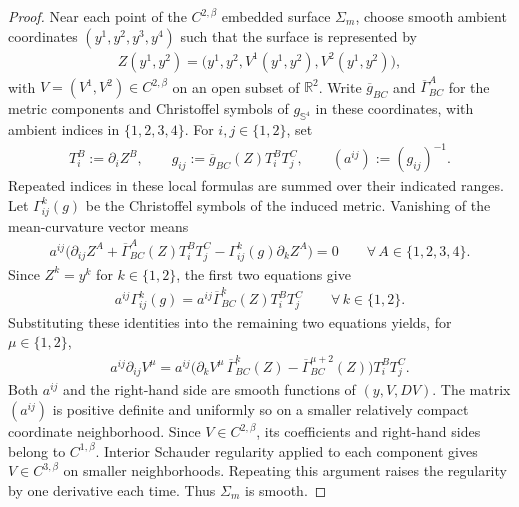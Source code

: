 \documentclass[a4paper,11pt,oneside,reqno]{amsart}
\numberwithin{equation}{section}
\theoremstyle{definition}
\begin{document}
\begin{proof}
    Near each point of the $C^{2,\beta}$ embedded surface
    $\Sigma_m$, choose smooth ambient coordinates
    $(y^1,y^2,y^3,y^4)$ such that the surface is represented by
    \begin{align*}
        Z(y^1,y^2)
        =\bigl(y^1,y^2,V^1(y^1,y^2),V^2(y^1,y^2)\bigr),
    \end{align*}
    with $V=(V^1,V^2)\in C^{2,\beta}$ on an open subset of
    $\mathbb R^2$. Write $\overline g_{BC}$ and
    $\overline\Gamma^A_{BC}$ for the metric components and
    Christoffel symbols of $g_{\mathbb S^4}$ in these coordinates,
    with ambient indices in $\{1,2,3,4\}$.
    For $i,j\in\{1,2\}$, set
    \begin{align*}
        T_i^B:=\partial_i Z^B,
        \qquad
        g_{ij}:=\overline g_{BC}(Z)T_i^BT_j^C,
        \qquad
        (a^{ij}):=(g_{ij})^{-1}.
    \end{align*}
    Repeated indices in these local formulas are summed over
    their indicated ranges. Let $\Gamma^k_{ij}(g)$ be the
    Christoffel symbols of the induced metric.
    Vanishing of the mean-curvature vector means
    \begin{align*}
        a^{ij}\bigl(
        \partial_{ij}Z^A
        +\overline\Gamma^A_{BC}(Z)T_i^BT_j^C
        -\Gamma^k_{ij}(g)\partial_k Z^A
        \bigr)=0
        \qquad\forall\,A\in\{1,2,3,4\}.
    \end{align*}
    Since $Z^k=y^k$ for $k\in\{1,2\}$, the first two
    equations give
    \begin{align*}
        a^{ij}\Gamma^k_{ij}(g)
        =a^{ij}\overline\Gamma^k_{BC}(Z)T_i^BT_j^C
        \qquad\forall\,k\in\{1,2\}.
    \end{align*}
    Substituting these identities into the remaining two
    equations yields, for $\mu\in\{1,2\}$,
    \begin{align*}
        a^{ij}\partial_{ij}V^\mu
        =a^{ij}\bigl(
        \partial_kV^\mu\,\overline\Gamma^k_{BC}(Z)
        -\overline\Gamma^{\mu+2}_{BC}(Z)
        \bigr)T_i^BT_j^C.
    \end{align*}
    Both $a^{ij}$ and the right-hand side are smooth functions
    of $(y,V,DV)$. The matrix $(a^{ij})$ is positive definite
    and uniformly so on a smaller relatively compact coordinate
    neighborhood. Since $V\in C^{2,\beta}$, its coefficients
    and right-hand sides belong to $C^{1,\beta}$.
    Interior Schauder regularity applied to each component
    gives $V\in C^{3,\beta}$ on smaller neighborhoods.
    Repeating this argument raises the regularity by one
    derivative each time. Thus $\Sigma_m$ is smooth.


\end{proof}
\end{document}

